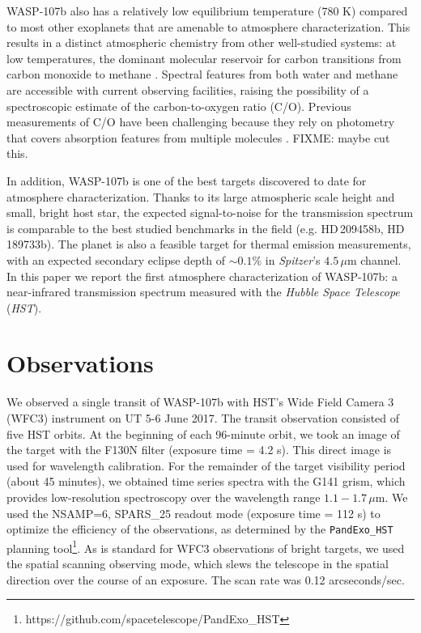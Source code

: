 \documentclass[twocolumn]{aastex61}
\begin{document}
WASP-107b also has a relatively low equilibrium temperature (780 K) compared to most other exoplanets that are amenable to atmosphere characterization.  This results in a distinct atmospheric chemistry from other well-studied systems: at low temperatures, the dominant molecular reservoir for carbon transitions from carbon monoxide to methane \citep{moses13}.  Spectral features from both water and methane are accessible with current observing facilities, raising the possibility of a spectroscopic estimate of the carbon-to-oxygen ratio (C/O). Previous measurements of C/O have been challenging because they rely on photometry that covers absorption features from multiple molecules \citep[e.g.][]{madhusudhan11, line14, benneke15, kreidberg15b}. FIXME: maybe cut this.

In addition, WASP-107b is one of the best targets discovered to date for atmosphere characterization. Thanks to its large atmospheric scale height and small, bright host star, the expected signal-to-noise for the transmission spectrum is comparable to the best studied benchmarks in the field (e.g. HD\,209458b, HD\,189733b). The planet is also a feasible target for thermal emission measurements, with an expected secondary eclipse depth of $\sim0.1$\% in \emph{Spitzer}'s $4.5\,\mu$m channel. In this paper we report the first atmosphere characterization of WASP-107b: a near-infrared transmission spectrum measured with the \emph{Hubble Space Telescope} (\emph{HST}).

\section{Observations}
We observed a single transit of WASP-107b with HST's Wide Field Camera 3 (WFC3) instrument on UT 5-6 June 2017.  The transit observation consisted of five HST orbits. At the beginning of each 96-minute orbit, we took an image of the target with the F130N filter (exposure time = 4.2 s). This direct image is used for wavelength calibration. For the remainder of the target visibility period (about 45 minutes), we obtained time series spectra with the G141 grism, which provides low-resolution spectroscopy over the wavelength range $1.1 - 1.7\,\mu$m.  We used the NSAMP=6, SPARS\_25 readout mode (exposure time = 112 s) to optimize the efficiency of the observations, as determined by the \texttt{PandExo\_HST} planning tool\footnote{https://github.com/spacetelescope/PandExo\_HST}.  As is standard for WFC3 observations of bright targets, we used the spatial scanning observing mode, which slews the telescope in the spatial direction over the course of an exposure. The scan rate was 0.12 arcseconds/sec.
\end{document}
